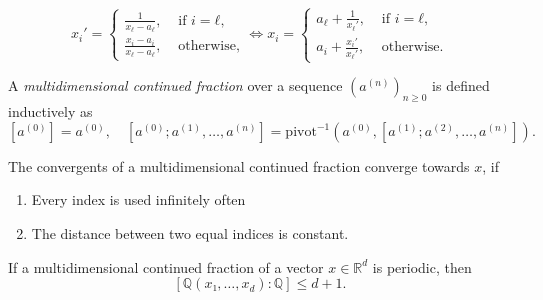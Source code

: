 \documentclass[aspectratio=169]{beamer}
\begin{document}
\begin{frame}
  \[
    x_i' =
    \begin{cases}
      \frac{1}{x_ℓ - a_ℓ}, & \text{ if } i = ℓ, \\
      \frac{x_i - a_i}{x_ℓ - a_ℓ}, & \text{ otherwise},
    \end{cases}
    \iff
    x_i =
    \begin{cases}
      a_ℓ + \frac{1}{x_ℓ'}, & \text{ if } i = ℓ, \\
      a_i + \frac{x_i'}{x_ℓ'}, & \text{ otherwise}.
    \end{cases}
  \]
\end{frame}

\begin{frame}
  \begin{definition}
    A \emph{multidimensional continued fraction} over a sequence
    $(a^{(n)})_{n≥0}$ is defined inductively as
    \[
      [a^{(0)}] = a^{(0)}, \quad
      [a^{(0)}; a^{(1)}, …, a^{(n)}] = \mathrm{pivot}^{-1}(a^{(0)}, [a^{(1)}; a^{(2)}, …, a^{(n)}]).
    \]
  \end{definition}
\end{frame}

\begin{frame}
  \begin{theorem}
    The convergents of a multidimensional continued fraction converge towards $x$, if
    \begin{enumerate}
      \item Every index is used infinitely often
      \item The distance between two equal indices is constant.
    \end{enumerate}
  \end{theorem}
\end{frame}

\begin{frame}
  \begin{center}
    
  \end{center}
\end{frame}

\begin{frame}
  \begin{theorem}
    If a multidimensional continued fraction of a vector $x ∈ ℝ^d$ is periodic, then \[
      [ℚ(x₁, …, x_d) : ℚ] ≤ d+1.
    \]
  \end{theorem}
\end{frame}

\begin{frame}

\end{frame}

\begin{frame}
\end{frame}
\end{document}
